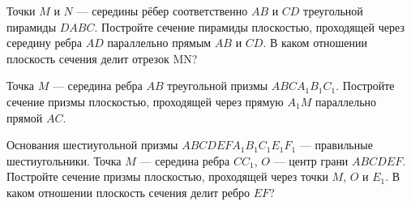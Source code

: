 \begin{class}[number=3]
	\begin{listofex}
		\item Точки \( M \) и \( N \) --- середины рёбер соответственно \( AB \) и \( CD \) треугольной пирамиды \( DABC \).
		Постройте сечение пирамиды плоскостью, проходящей через середину ребра \( AD \) параллельно прямым \( AB \) и \( CD \).
		В каком отношении плоскость сечения делит отрезок MN?
		\item Точка \( M \) --- середина ребра \( AB \) треугольной призмы \( ABCA_1B_1C_1 \).
		Постройте сечение призмы плоскостью,
		проходящей через прямую \( A_1M \) параллельно прямой \( AC \).
		\item Основания шестиугольной призмы \( ABCDEFA_1B_1C_1E_1F_1 \) --- правильные шестиугольники.
		Точка \( M \) --- середина ребра \( CC_1 \),
		\( O \) --- центр грани \( ABCDEF \).
		Постройте сечение призмы плоскостью, проходящей через
		точки \( M \), \( O \) и \( E_1 \).
		В каком отношении плоскость сечения делит ребро \(EF\)?
	\end{listofex}
\end{class}

